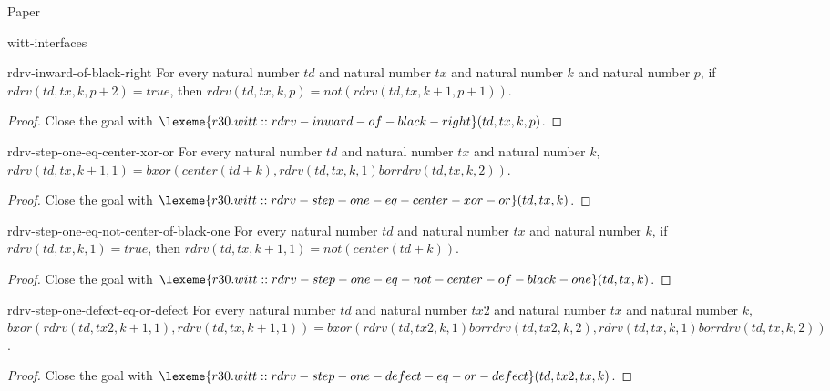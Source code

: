\begin{lexlean}{Paper}
\begin{section}{witt-interfaces}
  \begin{theorem}{rdrv-inward-of-black-right}
  For every natural number \(td\) and natural number \(tx\) and natural number \(k\) and natural number \(p\), if \(rdrv(td, tx, k, p + 2) = true\), then \(rdrv(td, tx, k, p) = not(rdrv(td, tx, k + 1, p + 1))\).
  \begin{proof}
  Close the goal with \(\lexeme{r30.witt::rdrv-inward-of-black-right}(td, tx, k, p)\).
  \end{proof}
  \end{theorem}

  \begin{theorem}{rdrv-step-one-eq-center-xor-or}
  For every natural number \(td\) and natural number \(tx\) and natural number \(k\), \(rdrv(td, tx, k + 1, 1) = bxor(center(td + k), rdrv(td, tx, k, 1) bor rdrv(td, tx, k, 2))\).
  \begin{proof}
  Close the goal with \(\lexeme{r30.witt::rdrv-step-one-eq-center-xor-or}(td, tx, k)\).
  \end{proof}
  \end{theorem}

  \begin{theorem}{rdrv-step-one-eq-not-center-of-black-one}
  For every natural number \(td\) and natural number \(tx\) and natural number \(k\), if \(rdrv(td, tx, k, 1) = true\), then \(rdrv(td, tx, k + 1, 1) = not(center(td + k))\).
  \begin{proof}
  Close the goal with \(\lexeme{r30.witt::rdrv-step-one-eq-not-center-of-black-one}(td, tx, k)\).
  \end{proof}
  \end{theorem}

  \begin{theorem}{rdrv-step-one-defect-eq-or-defect}
  For every natural number \(td\) and natural number \(tx2\) and natural number \(tx\) and natural number \(k\), \(bxor(rdrv(td, tx2, k + 1, 1), rdrv(td, tx, k + 1, 1)) = bxor(rdrv(td, tx2, k, 1) bor rdrv(td, tx2, k, 2), rdrv(td, tx, k, 1) bor rdrv(td, tx, k, 2))\).
  \begin{proof}
  Close the goal with \(\lexeme{r30.witt::rdrv-step-one-defect-eq-or-defect}(td, tx2, tx, k)\).
  \end{proof}
  \end{theorem}


\end{section}
\end{lexlean}
